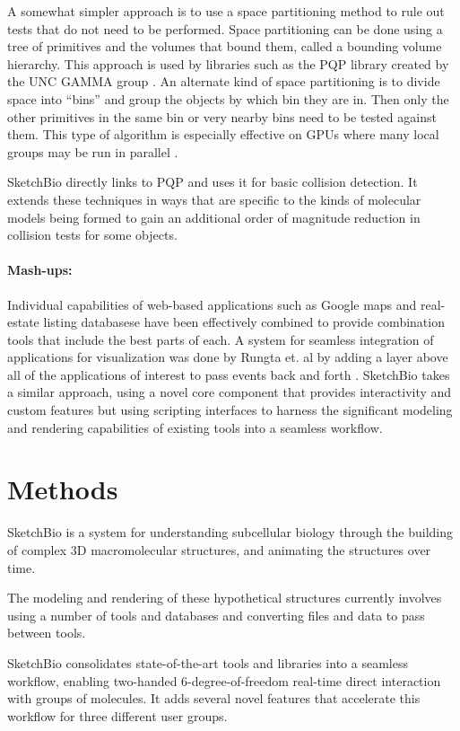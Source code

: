 \documentclass[twocolumn]{bmcart}%
\begin{document}
A somewhat simpler approach is to use a space partitioning method to rule out tests that do not need to be performed.  Space partitioning can be done using a tree of primitives and the volumes that bound them, called a bounding volume hierarchy.  This approach is used by libraries such as the PQP library created by the UNC GAMMA group \cite{PQP}.  An alternate kind of space partitioning is to divide space into “bins” and group the objects by which bin they are in.  Then only the other primitives in the same bin or very nearby bins need to be tested against them.  This type of algorithm is especially effective on GPUs where many local groups may be run in parallel \cite{oat2008efficient}.

SketchBio directly links to PQP and uses it for basic collision detection.  It extends these techniques in ways that are specific to the kinds of molecular models being formed to gain an additional order of magnitude reduction in collision tests for some objects.

\paragraph*{Mash-ups:}
Individual capabilities of web-based applications such as Google maps and real-estate listing databasese have been effectively combined to provide combination tools that include the best parts of each.  A system for seamless integration of applications for visualization was done by Rungta et. al by adding a layer above all of the applications of interest to pass events back and forth \cite{rungta2013manyvis}.  SketchBio takes a similar approach, using a novel core component that provides interactivity and custom features but using scripting interfaces to harness the significant modeling and rendering capabilities of existing tools into a seamless workflow.

\section*{Methods}

SketchBio is a system for understanding subcellular biology through the building of complex 3D macromolecular structures, and animating the structures over time.

The modeling and rendering of these hypothetical structures currently involves using a number of tools and databases and converting files and data to pass between tools.

SketchBio consolidates state-of-the-art tools and libraries into a seamless workflow, enabling two-handed 6-degree-of-freedom real-time direct interaction with groups of molecules.  It adds several novel features that accelerate this workflow for three different user groups.
\end{document}

